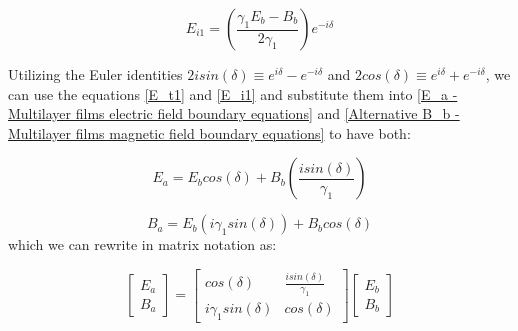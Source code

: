     \begin{equation} \label{E_i1}
    E_{i1} = \left(\frac{\gamma_1E_b - B_b}{2\gamma_1}\right)e^{-i\delta}
    \end{equation}

Utilizing the Euler identities $2isin(\delta) \equiv e^{i\delta} - e^{-i\delta}$ and $2cos(\delta) \equiv e^{i\delta} + e^{-i\delta}$, we can use the equations \ref{E_t1} and \ref{E_i1} and substitute them into \ref{E_a - Multilayer films electric field boundary equations} and \ref{Alternative B_b - Multilayer films magnetic field boundary equations} to have both:

    \begin{equation} \label{E_a in terms of E_b and B_b}
    E_a = E_bcos(\delta) + B_b\left(\frac{isin(\delta)}{\gamma_1}\right)
    \end{equation}
    
    \begin{equation} \label{B_a in terms of E_b and B_b}
    B_a = E_b(i\gamma_1sin(\delta)) + B_bcos(\delta)
    \end{equation}
which we can rewrite in matrix notation as:

    \[
      \begin{bmatrix}\label{Full form transfer matrix}
        E_a  \\
        B_a
      \end{bmatrix} = 
            \begin{bmatrix}
            cos(\delta) & \frac{isin(\delta)}{\gamma_1}    \\
            i\gamma_1sin(\delta) & cos(\delta)
            \end{bmatrix}
            \begin{bmatrix}
            E_b  \\
            B_b
          \end{bmatrix}
    \]

